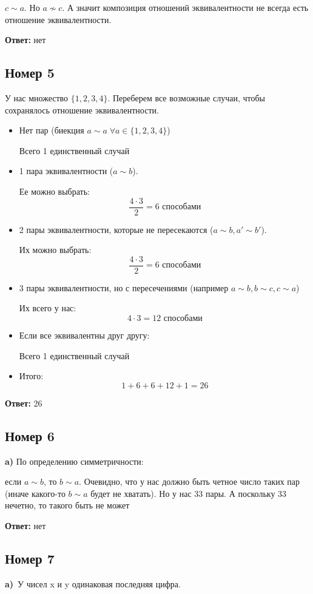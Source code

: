 \documentclass[a4paper,12pt]{article}
\begin{document}
$c \sim a$. Но $a \nsim c$. А значит композиция отношений эквивалентности не всегда есть отношение эквивалентности.
\begin{center}
\textbf{Ответ:} нет
\end{center}
\subsection*{Номер 5}
У нас множество $\{1,  2, 3, 4 \}$. Переберем все возможные случаи, чтобы сохранялось отношение эквивалентности.
\begin{itemize}
\item 
Нет пар (биекция $a \sim a \; \forall a \in \{1, 2, 3, 4\}$)

Всего 1 единственный случай
\item
1 пара эквивалентности ($a \sim b$).

Ее можно выбрать:
\[
\frac{4 \cdot 3}{2}  =6 \text{ способами}
\]
\item
2 пары эквивалентности, которые не пересекаются ($a \sim b, a' \sim b '$).

Их можно выбрать:
\[
\frac{4 \cdot 3}{2} = 6 \text{ способами}
\]
\item
3 пары эквивалентности, но с пересечениями (например $ a \sim b, b \sim c, c \sim a$)

Их всего у нас:
\[
4 \cdot 3 = 12 \text{ способами}
\]
\item
Если все эквивалентны друг другу:

Всего 1 единственный случай

\item
Итого:
\[
1 + 6 + 6 + 12 + 1 = 26
\]
\end{itemize}
\begin{center}
\textbf{Ответ:} 26
\end{center}
\subsection*{Номер 6}
\textbf{a)}
По определению симметричности:

если $a \sim b$,  то $b \sim a$. Очевидно, что у нас должно быть четное число таких пар (иначе какого-то $b \sim a$ будет не хватать). Но у нас 33 пары. А поскольку 33 нечетно, то такого быть не может
\begin{center}
\textbf{Ответ:} нет
\end{center}


\subsection*{Номер 7}
\textbf{a)} У чисел x и y одинаковая последняя цифра.
\end{document}
